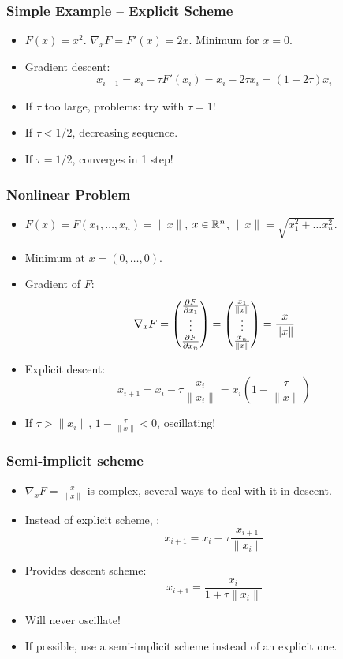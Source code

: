 \documentclass[10pt]{beamer}
\newcommand{\myemph}[1]{{\color{blue}{#1}}}
\begin{document}
\begin{frame}
  \frametitle{Simple Example -- Explicit Scheme}
  \begin{itemize}
  \item $F(x) = x^2$. $\nabla_x F = F'(x) = 2x$. Minimum for $x = 0$.
  \item Gradient descent:
    $$
    x_{i+1} = x_i - \tau F'(x_i) = x_i - 2\tau x_i = (1-2\tau)x_i
    $$
  \item If $\tau$ too large, problems: try with $\tau = 1$!
  \item If $\tau < 1/2$, decreasing sequence.
  \item If $\tau = 1/2$, converges in 1 step! 
  \end{itemize}
\end{frame}

\begin{frame}
  \frametitle{Nonlinear Problem}
  \begin{itemize}
  \item $F(x) = F(x_1,\dots,x_n) = \|x\|$, $x\in{\mathbb R}^n$, $\|x\| = \sqrt{x_1^2+\dots x_n^2}$.
  \item Minimum at $x = (0,\dots,0)$.
  \item Gradient of $F$: 
    $$
    \nabla_x F = 
    \begin{pmatrix}
      \frac{\partial{F}}{\partial{x_1}}\\
      \vdots\\
      \frac{\partial{F}}{\partial{x_n}}
    \end{pmatrix}
    =
    \begin{pmatrix}
      \frac{x_1}{\|x\|}\\
      \vdots\\
      \frac{x_n}{\|x\|}
    \end{pmatrix}
    =
    \frac{x}{\|x\|}
    $$
    \item Explicit descent:
      $$
      x_{i+1} = x_i -\tau \frac{x_i}{\|x_i\|} = x_i\left(1-\frac{\tau}{\|x\|}\right)
      $$
    \item If $\tau > \|x_i\|$, $1-\frac{\tau}{\|x\|} < 0$, oscillating!
  \end{itemize}
\end{frame}


\begin{frame}
  \frametitle{Semi-implicit scheme}
  \begin{itemize}
  \item $\nabla_x F = \frac{x}{\|x\|}$ is complex, several ways to deal with it in descent.
  \item Instead of explicit scheme, \myemph{semi-implicit}:
    $$
    x_{i+1} = x_i -\tau\frac{x_{i+1}}{\|x_i\|}
    $$
  \item Provides descent scheme:
    $$
    x_{i+1} = \frac{x_i}{1+ \tau\|x_i\|}
    $$
  \item Will never oscillate!
  \item If possible, use a semi-implicit scheme instead of an explicit one.
  \end{itemize}
\end{frame}
\end{document}
